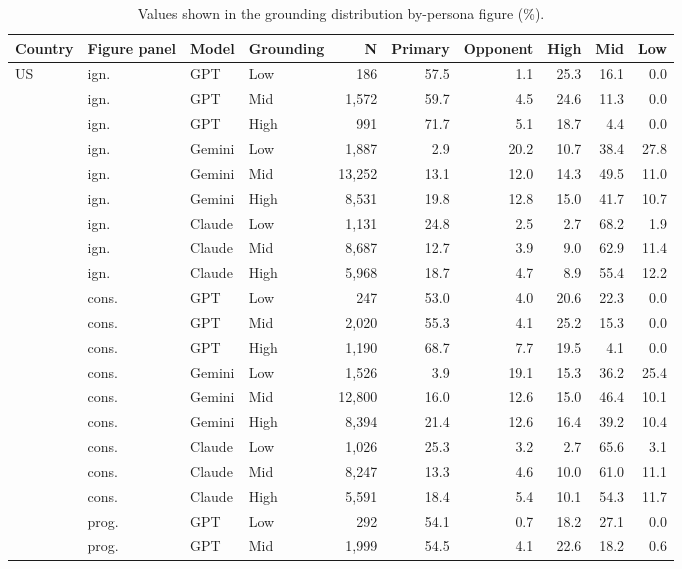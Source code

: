 \begin{table}[t]
\centering
\footnotesize
\setlength{\tabcolsep}{2pt}
\caption{Values shown in the grounding distribution by-persona figure (\%).}
\label{tab:grounding-by-persona-values}
\begin{tabular}{llllrrrrrr}
\toprule
\textbf{Country} & \textbf{Figure panel} & \textbf{Model} & \textbf{Grounding} & \textbf{N} & \textbf{Primary} & \textbf{Opponent} & \textbf{High} & \textbf{Mid} & \textbf{Low} \\
\midrule
US & ign. & GPT & Low & 186 & 57.5 & 1.1 & 25.3 & 16.1 & 0.0 \\
 & ign. & GPT & Mid & 1{,}572 & 59.7 & 4.5 & 24.6 & 11.3 & 0.0 \\
 & ign. & GPT & High & 991 & 71.7 & 5.1 & 18.7 & 4.4 & 0.0 \\
 & ign. & Gemini & Low & 1{,}887 & 2.9 & 20.2 & 10.7 & 38.4 & 27.8 \\
 & ign. & Gemini & Mid & 13{,}252 & 13.1 & 12.0 & 14.3 & 49.5 & 11.0 \\
 & ign. & Gemini & High & 8{,}531 & 19.8 & 12.8 & 15.0 & 41.7 & 10.7 \\
 & ign. & Claude & Low & 1{,}131 & 24.8 & 2.5 & 2.7 & 68.2 & 1.9 \\
 & ign. & Claude & Mid & 8{,}687 & 12.7 & 3.9 & 9.0 & 62.9 & 11.4 \\
 & ign. & Claude & High & 5{,}968 & 18.7 & 4.7 & 8.9 & 55.4 & 12.2 \\
 & cons. & GPT & Low & 247 & 53.0 & 4.0 & 20.6 & 22.3 & 0.0 \\
 & cons. & GPT & Mid & 2{,}020 & 55.3 & 4.1 & 25.2 & 15.3 & 0.0 \\
 & cons. & GPT & High & 1{,}190 & 68.7 & 7.7 & 19.5 & 4.1 & 0.0 \\
 & cons. & Gemini & Low & 1{,}526 & 3.9 & 19.1 & 15.3 & 36.2 & 25.4 \\
 & cons. & Gemini & Mid & 12{,}800 & 16.0 & 12.6 & 15.0 & 46.4 & 10.1 \\
 & cons. & Gemini & High & 8{,}394 & 21.4 & 12.6 & 16.4 & 39.2 & 10.4 \\
 & cons. & Claude & Low & 1{,}026 & 25.3 & 3.2 & 2.7 & 65.6 & 3.1 \\
 & cons. & Claude & Mid & 8{,}247 & 13.3 & 4.6 & 10.0 & 61.0 & 11.1 \\
 & cons. & Claude & High & 5{,}591 & 18.4 & 5.4 & 10.1 & 54.3 & 11.7 \\
 & prog. & GPT & Low & 292 & 54.1 & 0.7 & 18.2 & 27.1 & 0.0 \\
 & prog. & GPT & Mid & 1{,}999 & 54.5 & 4.1 & 22.6 & 18.2 & 0.6 \\

\end{tabular}
\end{table}

